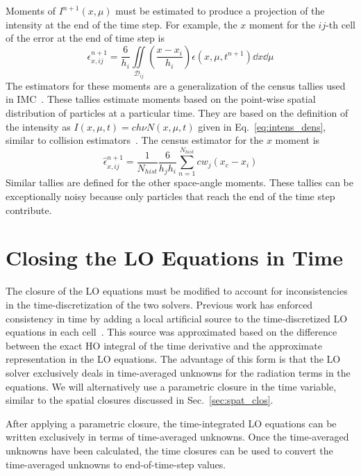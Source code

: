 Moments of $I^{n+1}(x,\mu)$ must be estimated to produce a projection of the intensity at
the end of the time step.
For example, the $x$ moment for the $ij$-th cell of the error at the end of time step is
\begin{equation}
    \epsilon^{n+1}_{x,ij} = \frac{6}{h_i} \iint\limits_{\mathcal{D}_{ij}} \left(\frac{x
    - x_i}{h_i}\right) \epsilon(x,\mu,t^{n+1}) \dd x \dd \mu
\end{equation}
The estimators for these moments are a generalization of the census
tallies used in IMC~\cite{wollaber_review,wollaber_thesis}.  These tallies estimate
moments based on the point-wise spatial distribution of particles at a particular time.
They are based on the definition of the intensity as $I(x,\mu,t) = c h \nu N(x,\mu,t)$ given in
Eq.~\eqref{eq:intens_dens}, similar to collision estimators~\cite{shultis_mc,mcnp}.  The census estimator for the $x$ moment is
\begin{equation}
    \hat\epsilon^{n+1}_{x,ij} = \frac{1}{N_{hist}} \frac{6}{h_j h_i} \sum_{n=1}^{N_{hist}}
    c w_j  \left(x_{c} - x_{i}\right)
\end{equation}
Similar tallies are defined for the other space-angle moments. These tallies can be
exceptionally noisy because only particles that reach the end of the time step contribute.


\section{Closing the LO Equations in Time}

The closure of the LO equations must be modified to account for inconsistencies in the
time-discretization of the two solvers. Previous work has enforced
consistency in time by adding a local artificial source to the time-discretized LO
equations in each cell~\cite{holo_rh}.  This
source was approximated based on the difference between the exact HO integral of the time
derivative and the approximate representation in the LO equations. The advantage
of this form is that the LO solver exclusively deals in
time-averaged unknowns for the radiation terms in the equations.  
We will alternatively use a
parametric closure in the time variable, similar to the spatial closures discussed in 
Sec.~\ref{sec:spat_clos}. 


After applying a parametric closure, the time-integrated LO equations can be written exclusively in terms
of time-averaged unknowns.   Once the time-averaged unknowns have been calculated,
the time closures can be used to convert the time-averaged unknowns to end-of-time-step
values.

